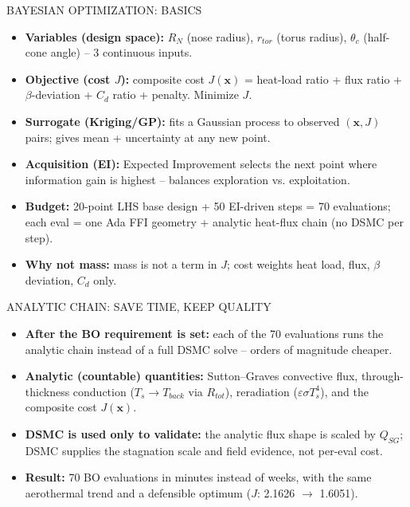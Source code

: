 \documentclass[aspectratio=169,11pt]{beamer}
\begin{document}
\begin{frame}{BAYESIAN OPTIMIZATION: BASICS}
  \small
  \begin{itemize}
    \item \textbf{Variables (design space):} $R_N$ (nose radius), $r_{tor}$ (torus radius), $\theta_c$ (half-cone angle) -- 3 continuous inputs.
    \item \textbf{Objective (cost $J$):} composite cost $J(\mathbf{x})$ = heat-load ratio + flux ratio + $\beta$-deviation + $C_d$ ratio + penalty. Minimize $J$.
    \item \textbf{Surrogate (Kriging/GP):} fits a Gaussian process to observed $(\mathbf{x}, J)$ pairs; gives mean + uncertainty at any new point.
    \item \textbf{Acquisition (EI):} Expected Improvement selects the next point where information gain is highest -- balances exploration vs. exploitation.
    \item \textbf{Budget:} 20-point LHS base design + 50 EI-driven steps = 70 evaluations; each eval = one Ada FFI geometry + analytic heat-flux chain (no DSMC per step).
    \item \textbf{Why not mass:} mass is not a term in $J$; cost weights heat load, flux, $\beta$ deviation, $C_d$ only.
  \end{itemize}
\end{frame}

\begin{frame}{ANALYTIC CHAIN: SAVE TIME, KEEP QUALITY}
  \small
  \begin{itemize}
    \item \textbf{After the BO requirement is set:} each of the 70 evaluations runs the
      analytic chain instead of a full DSMC solve -- orders of magnitude cheaper.
    \item \textbf{Analytic (countable) quantities:} Sutton--Graves convective flux,
      through-thickness conduction ($T_s \to T_{back}$ via $R_{tot}$), reradiation
      ($\varepsilon\sigma T_s^4$), and the composite cost $J(\mathbf{x})$.
    \item \textbf{DSMC is used only to validate:} the analytic flux shape is scaled by
      $Q_{SG}$; DSMC supplies the stagnation scale and field evidence, not per-eval cost.
    \item \textbf{Result:} 70 BO evaluations in minutes instead of weeks, with the same
      aerothermal trend and a defensible optimum ($J$: 2.1626 $\to$ 1.6051).
  \end{itemize}
\end{frame}
\end{document}
